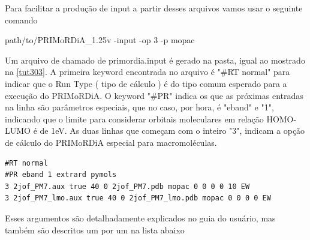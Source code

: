 \documentclass[a4paper,11pt]{refart}
\begin{document}
Para facilitar a produção de input a partir desses arquivos vamos usar o seguinte comando


\hspace*{-1.2\leftmarginwidth}
\begin{minipage}{\fullwidth}
\begin{commandshell}path/to/PRIMoRDiA_1.25v -input -op 3 -p mopac\end{commandshell}
\end{minipage}


Um arquivo de chamado de primordia.input é gerado na pasta, igual ao mostrado na \autoref{tut303}. A primeira keyword encontrada no arquivo é "\#RT normal" para indicar que o Run Type ( tipo de cálculo ) é do tipo comum esperado para a execução do PRIMoRDiA. O keyword "\#PR" indica os que as próximas entradas na linha são parâmetros especiais, que no caso, por hora, é "eband" e "1", indicando que o limite para considerar orbitais moleculares em relação HOMO-LUMO é de 1eV. As duas linhas que começam com o inteiro "3", indicam a opção de cálculo do PRIMoRDiA especial para macromoléculas. 

\hspace*{-1\leftmarginwidth}
\begin{minipage}{\fullwidth}
\begin{lstlisting}[caption={Input editado para execução do tutorial 3},label={tut301}]
#RT normal 
#PR eband 1 extrard pymols 
3 2jof_PM7.aux true 40 0 2jof_PM7.pdb mopac 0 0 0 0 10 EW 
3 2jof_PM7_lmo.aux true 40 0 2jof_PM7_lmo.pdb mopac 0 0 0 0 EW	
\end{lstlisting}
\end{minipage}

Esses argumentos são detalhadamente explicados no guia do usuário, mas também são descritos um por um na lista abaixo
\end{document}
